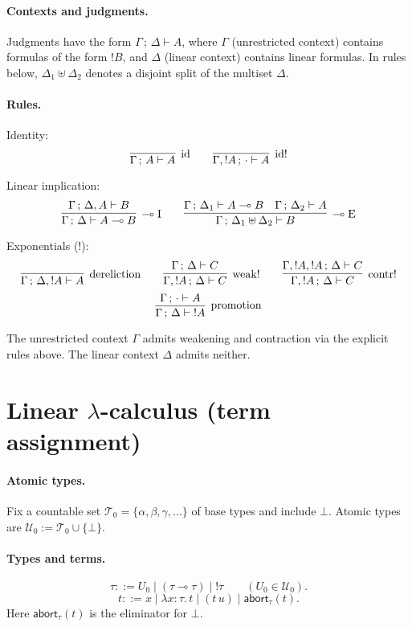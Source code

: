 \paragraph{Contexts and judgments.}
Judgments have the form $\Gamma \,;\, \Delta \vdash A$, where $\Gamma$ (unrestricted context) contains formulas of the form ${!}B$, and $\Delta$ (linear context) contains linear formulas. In rules below, $\Delta_1 \uplus \Delta_2$ denotes a disjoint split of the multiset $\Delta$.

\paragraph{Rules.}
Identity:
\[
\infer[\mathrm{id}]
      {\Gamma \,;\, A \vdash A}{}
\qquad
\infer[\mathrm{id}!]
      {\Gamma,{!}A \,;\, \cdot \vdash A}{}
\]

Linear implication:
\[
\infer[\multimap\mathrm{I}]
      {\Gamma \,;\, \Delta \vdash A \multimap B}
      {\Gamma \,;\, \Delta, A \vdash B}
\qquad
\infer[\multimap\mathrm{E}]
      {\Gamma \,;\, \Delta_1 \uplus \Delta_2 \vdash B}
      {\Gamma \,;\, \Delta_1 \vdash A \multimap B
       \quad
       \Gamma \,;\, \Delta_2 \vdash A}
\]

Exponentials (${!}$):
\[
\infer[\mathrm{dereliction}]
      {\Gamma \,;\, \Delta, {!}A \vdash A}{}
\qquad
\infer[\mathrm{weak}!]
      {\Gamma,{!}A \,;\, \Delta \vdash C}
      {\Gamma \,;\, \Delta \vdash C}
\qquad
\infer[\mathrm{contr}!]
      {\Gamma,{!}A \,;\, \Delta \vdash C}
      {\Gamma,{!}A,{!}A \,;\, \Delta \vdash C}
\]
\[
\infer[\mathrm{promotion}]
      {\Gamma \,;\, \Delta \vdash {!}A}
      {\Gamma \,;\, \cdot \vdash A}
\]

The unrestricted context $\Gamma$ admits weakening and contraction via the explicit rules above. The linear context $\Delta$ admits neither.

\section{Linear $\lambda$-calculus (term assignment)}
\label{sec:lin-lambda}

\paragraph{Atomic types.}
Fix a countable set $\mathcal{T}_0=\{\alpha,\beta,\gamma,\dots\}$ of base types and include $\bot$. Atomic types are $\mathcal{U}_0:=\mathcal{T}_0 \cup \{\bot\}$.

\paragraph{Types and terms.}
\[
\tau ::= U_0 \mid (\tau \multimap \tau) \mid {!}\tau
\qquad (U_0 \in \mathcal{U}_0).
\]
\[
t ::= x \mid \lambda x{:}\tau.\, t \mid (t\,u) \mid \mathsf{abort}_{\tau}(t).
\]
Here $\mathsf{abort}_{\tau}(t)$ is the eliminator for $\bot$.

